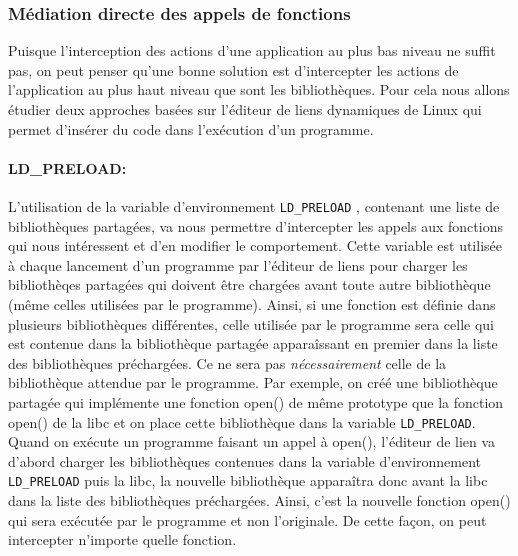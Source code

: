\subsubsection{Médiation directe des appels de fonctions}

Puisque l'interception des actions d'une application au plus bas niveau ne
suffit pas, on peut penser qu'une bonne solution est d'intercepter les actions
de l'application au plus haut niveau que sont les bibliothèques. Pour cela nous
allons étudier deux approches basées sur l'éditeur de liens dynamiques de Linux
qui permet d'insérer du code dans l'exécution d'un programme.

\paragraph{LD\_PRELOAD:}
\label{paragraphe:LDPreload}

L'utilisation de la variable d'environnement \texttt{LD\_PRELOAD}
\citep{LDPreload}, contenant une liste de bibliothèques partagées, va nous
permettre d'intercepter les appels aux fonctions qui nous intéressent et d'en
modifier le comportement. Cette variable est utilisée à chaque lancement d'un
programme par l'éditeur de liens pour charger les bibliothèqes partagées qui
doivent être chargées avant toute autre bibliothèque (même celles utilisées par
le programme). Ainsi, si une fonction est définie dans plusieurs bibliothèques
différentes, celle utilisée par le programme sera celle qui est contenue dans la
bibliothèque partagée apparaîssant en premier dans la liste des bibliothèques
préchargées. Ce ne sera pas \textit{nécessairement} celle de la bibliothèque
attendue par le programme. Par exemple, on créé une bibliothèque partagée qui
implémente une fonction open() de même prototype que la fonction open() de la
libc et on place cette bibliothèque dans la variable \texttt{LD\_PRELOAD}. Quand
on exécute un programme faisant un appel à open(), l'éditeur de lien va d'abord
charger les bibliothèques contenues dans la variable d'environnement
\texttt{LD\_PRELOAD} puis la libc, la nouvelle bibliothèque apparaîtra donc
avant la libc dans la liste des bibliothèques préchargées. Ainsi, c'est la
nouvelle fonction open() qui sera exécutée par le programme et non
l'originale. De cette façon, on peut intercepter n'importe quelle fonction.

